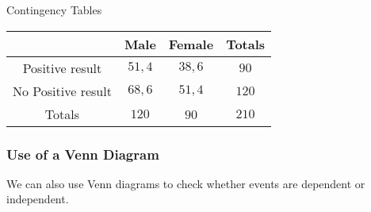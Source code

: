 \begin{wex}{Contingency Tables}
{\begin{center}
\begin{tabular}{|c|c|c|c|}
\hline
                   & Male & Female & Totals \\
\hline
Positive result    & $51,4$   & $38,6$     & $90$     \\
No Positive result & $68,6$   & $51,4$     & $120$    \\
\hline
Totals             & $120$  & $9$0     & $210$    \\
\hline
\end{tabular}
\end{center}
}
\end{wex}

\subsubsection{Use of a Venn Diagram}
We can also use Venn diagrams to check whether events are dependent or independent. 

